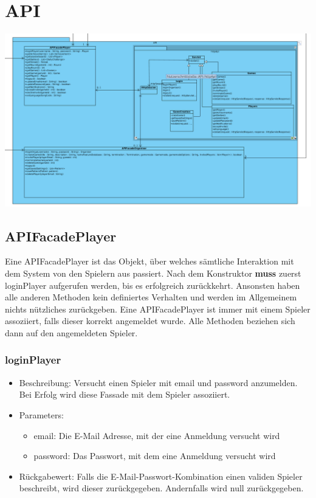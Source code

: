\documentclass[a4paper]{scrreprt}
\begin{document}
	\section{API}
	\includegraphics[width=\textwidth]{img/api.png}
	\subsection{APIFacadePlayer}
	Eine APIFacadePlayer ist das Objekt, über welches sämtliche Interaktion mit dem System von den Spielern aus passiert. Nach dem Konstruktor \textbf{muss} zuerst loginPlayer aufgerufen werden, bis es erfolgreich zurückkehrt. Ansonsten haben alle anderen Methoden kein definiertes Verhalten und werden im Allgemeinem nichts nützliches zurückgeben. Eine APIFacadePlayer ist immer mit einem Spieler assoziiert, falls dieser korrekt angemeldet wurde. Alle Methoden beziehen sich dann auf den angemeldeten Spieler.
	\subsubsection{loginPlayer}
	\begin{itemize}
		\item Beschreibung: Versucht einen Spieler mit email und password anzumelden. Bei Erfolg wird diese Fassade mit dem Spieler assoziiert.
		\item Parameters: 
		\begin{itemize}
			\item email: Die E-Mail Adresse, mit der eine Anmeldung versucht wird
			\item password: Das Passwort, mit dem eine Anmeldung versucht wird
		\end{itemize}
		\item Rückgabewert: Falls die E-Mail-Passwort-Kombination einen validen Spieler beschreibt, wird dieser zurückgegeben. Andernfalls wird null zurückgegeben.
	\end{itemize}
\end{document}
